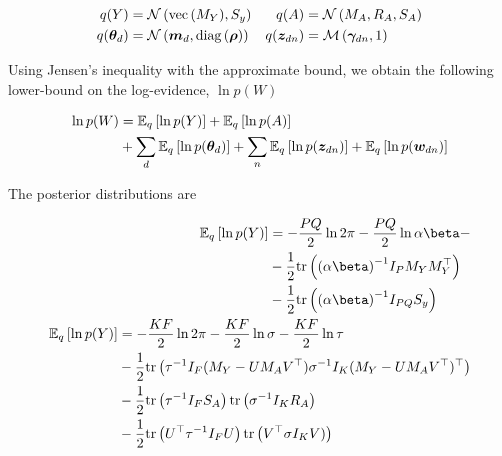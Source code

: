 \begin{equation}
\begin{split}
q(Y) &= \nor{\vecf{M_Y}}{S_y} &
q(A) &= \mnor{M_A}{R_A}{S_A} \\
q(\thd) &= \nor{\md}{\diag{\vv{\rho}}} &
q(\zdn) & = \muln{\gdn}{1} \\
\end{split}
\end{equation}


Using Jensen's inequality with the approximate bound, we obtain the following lower-bound on the log-evidence, $\ln p(W)$

\begin{equation}
\begin{split}
\ln p(W) 
&= \ex{\ln p(Y)}{q} + \ex{\ln p(A)}{q} \\
&+ \sum_d \ex{\ln p(\thd)}{q} + \sum_n \ex{\ln p(\zdn)}{q} + \ex{\ln p(\wdn)}{q}
\end{split}
\end{equation}

The posterior distributions are

\begin{align}
\begin{split}
\ex{\ln p(Y)}{q} 
    & = -\halve{PQ} \ln 2\pi - \halve{PQ} \ln \alpha \beta - \\
    & - \half \Tr{ \invb{\alpha \beta} I_P M_Y M_Y\T } \\
    & - \half \Tr{\invb{\alpha \beta} I_{PQ} S_y }
\end{split} \\
\begin{split}
\ex{\ln p(Y)}{q} 
    & = -\halve{KF} \ln 2\pi - \halve{KF} \ln \sigma - \halve{KF} \ln \tau \\
    & - \half \Tr{ \inv{\tau} I_F (M_Y - U M_A V\T) \inv{\sigma} I_K (M_Y - U M_A V\T)\T } \\
    & - \half \Tr{ \inv{\tau} I_F S_A}\Tr{\inv{\sigma} I_K R_A} \\
    & - \half \Tr{ U\T \inv{\tau}I_F U}\Tr{ V\T \sigma I_K V)}
\end{split}
\end{align}








